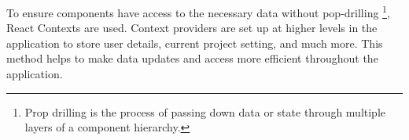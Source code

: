 To ensure components have access to the necessary data without pop-drilling \footnote{Prop drilling is the process of passing down data or state through multiple layers of a component hierarchy.}, React Contexts are used.
Context providers are set up at higher levels in the application to store user details, current project setting, and much more.
This method helps to make data updates and access more efficient throughout the application. 




